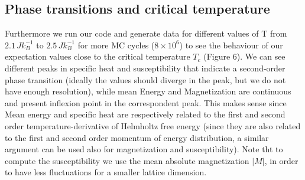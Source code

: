 \documentclass[%
 reprint,
 amsmath,amssymb,
 aps,
]{revtex4-1}
\theoremstyle{plain}
\theoremstyle{definition}
\theoremstyle{plain}
\begin{document}
\subsection{Phase transitions and critical temperature}
Furthermore we run our code and generate data for different values of T from $2.1\,Jk_B^{-1}$ to $2.5\,Jk_B^{-1}$ for more MC cycles ($8\times10^6$) to see the behaviour of our expectation values close to the critical temperature $T_c$ (Figure 6). We can see different peaks in specific heat and susceptibility that indicate a second-order phase transition (ideally the values should diverge in the peak, but we do not have enough resolution), while mean Energy and Magnetization are continuous and present inflexion point in the correspondent peak. This makes sense since Mean energy and specific heat are respectively related to the first and second order temperature-derivative of Helmholtz free energy (since they are also related to the first and second order momentum of energy distribution, a similar argument can be used also for magnetization and susceptibility). Note tht to compute the susceptibility we use the mean absolute magnetization $|M|$, in order to have less fluctuations for a smaller lattice dimension.
\end{document}
